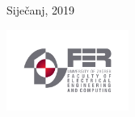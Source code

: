 \documentclass[11pt]{article}
\begin{document}
\begin{titlepage}
	
	
	\vfill\vfill\vfill %
	
	{\large Siječanj, 2019} %
	
	
	\vfill\vfill
	\includegraphics[width=0.3\textwidth]{fer_logo.jpg}\\[1cm] %
	 
	
	\vfill %
	
\end{titlepage}

\tableofcontents
\newpage
\end{document}
